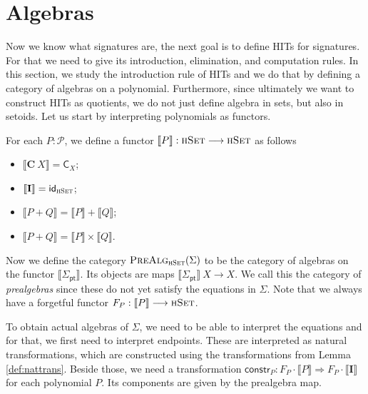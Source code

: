\documentclass[9pt]{entcs}
\newcommand{\type}[1]{\textsc{#1}}
\newcommand{\constructor}[1]{\mathbf{#1}}
\newcommand{\category}[1]{\textsc{#1}}
\newcommand{\functortxt}[1]{\mathsf{#1}}
\newcommand{\nattranstxt}[1]{\mathsf{#1}}
\newcommand{\hset}{\type{hSet}} %
\newcommand{\0}{\textbf{0}} %
\newcommand{\1}{\textbf{1}} %
\newcommand{\functor}[2]{#1 \longrightarrow #2} %
\newcommand{\idf}[1]{\functortxt{id}_{#1}} %
\newcommand{\Cf}[1]{\functortxt{C}_{#1}} %
\newcommand{\prodf}[2]{#1 \times #2} %
\newcommand{\sumf}[2]{#1 + #2} %
\newcommand{\nattrans}[2]{#1 \Longrightarrow #2} %
\newcommand{\constrt}[1]{\nattranstxt{constr}_{#1}} %
\newcommand{\poly}{\mathcal{P}} %
\newcommand{\C}{\constructor{C}} %
\newcommand{\I}{\constructor{I}} %
\newcommand{\sumP}[2]{#1 + #2} %
\newcommand{\comp}[2]{#1 \cdot #2} %
\newcommand{\pt}[0]{\textsf{pt}}
\newcommand{\pointc}[1]{#1_{\pt}} %
\newcommand{\semP}[1]{\llbracket #1 \rrbracket} %
\newcommand{\prealg}[1]{\category{PreAlg}_{\hset}(#1)} %
\newcommand{\forget}[1]{F_{#1}} %
\begin{document}
\section{Algebras}
\label{sec:algebras}
Now we know what signatures are, the next goal is to define HITs for signatures.
For that we need to give its introduction, elimination, and computation rules.
In this section, we study the introduction rule of HITs and we do that by defining a category of algebras on a polynomial.
Furthermore, since ultimately we want to construct HITs as quotients, we do not just define algebra in sets, but also in setoids.
Let us start by interpreting polynomials as functors.

\begin{definition}
\label{def:sempoly}
For each $P : \poly$, we define a functor $\semP{P} : \functor{\hset}{\hset}$ as follows
\begin{itemize}
	\item $\semP{\C \> X} = \Cf{X}$;
	\item $\semP{\I} = \idf{\hset}$;
	\item $\semP{\sumP{P}{Q}} = \sumf{\semP{P}}{\semP{Q}}$;
	\item $\semP{\sumP{P}{Q}} = \prodf{\semP{P}}{\semP{Q}}$.
\end{itemize}
\end{definition}

Now we define the category $\prealg{\Sigma}$ to be the category of algebras on the functor $\semP{\pointc{\Sigma}}$.
Its objects are maps $\semP{\pointc{\Sigma}} \> X \rightarrow X$.
We call this the category of \emph{prealgebras} since these do not yet satisfy the equations in $\Sigma$.
Note that we always have a forgetful functor $\forget{P} : \functor{\semP{P}}{\hset}$.

To obtain actual algebras of $\Sigma$, we need to be able to interpret the equations and for that, we first need to interpret endpoints.
These are interpreted as natural transformations, which are constructed using the transformations from Lemma \ref{def:nattrans}.
Beside those, we need a transformation $\constrt{P} : \nattrans{\comp{\forget{P}}{\semP{P}}}{\comp{\forget{P}}{\semP{\I}}}$ for each polynomial $P$.
Its components are given by the prealgebra map.
\end{document}
